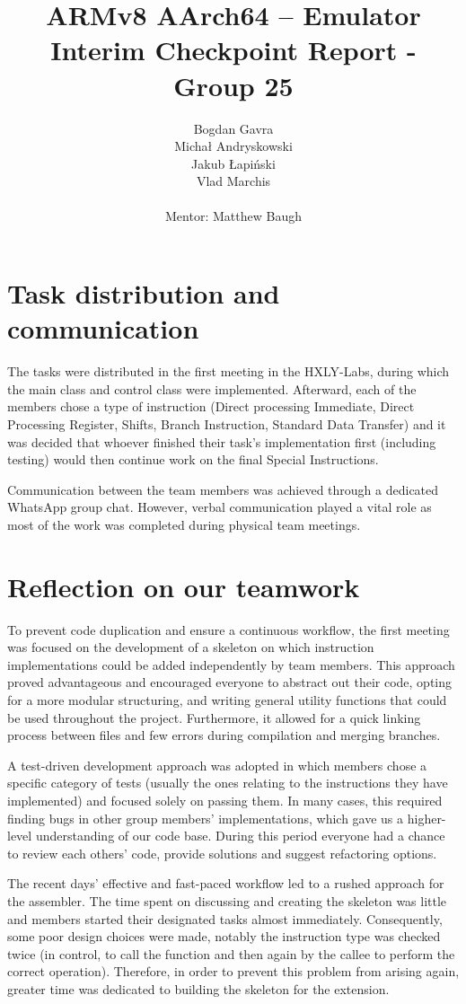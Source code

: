 \documentclass{article}
\title{ARMv8 AArch64 – Emulator \\
       \large Interim Checkpoint Report - Group 25}
\author{
        Bogdan Gavra \\
        Michał Andryskowski\\
        Jakub Łapiński\\
        Vlad Marchis\\\\
        Mentor: 
        Matthew Baugh
        }
\begin{document}
\maketitle

\section{Task distribution and communication}


The tasks were distributed in the first meeting in the HXLY-Labs, during which the main class and control class were implemented.
Afterward, each of the members chose a type of instruction (Direct processing Immediate, Direct Processing Register, Shifts, Branch Instruction, Standard Data Transfer) and it was decided that whoever finished their task's implementation first (including testing) would then continue work on the final Special Instructions.

Communication between the team members was achieved through a dedicated WhatsApp group chat. However, verbal communication played a vital role as most of the work was completed during physical team meetings.

\section{Reflection on our teamwork}

To prevent code duplication and ensure a continuous workflow, the first meeting was focused on the development of a skeleton on which instruction implementations could be added independently by team members. This approach proved advantageous and encouraged everyone to abstract out their code, opting for a more modular structuring, and writing general utility functions that could be used throughout the project. Furthermore, it allowed for a quick linking process between files and few errors during compilation and merging branches.

A test-driven development approach was adopted in which members chose a specific category of tests (usually the ones relating to the instructions they have implemented) and focused solely on passing them. In many cases, this required finding bugs in other group members' implementations, which gave us a higher-level understanding of our code base. During this period everyone had a chance to review each others' code, provide solutions and suggest refactoring options.

The recent days' effective and fast-paced workflow led to a rushed approach for the assembler. The time spent on discussing and creating the skeleton was little and members started their designated tasks almost immediately. Consequently, some poor design choices were made, notably the instruction type was checked twice (in control, to call the function and then again by the callee to perform the correct operation). Therefore, in order to prevent this problem from arising again, greater time was dedicated to building the skeleton for the extension.   
\end{document}
